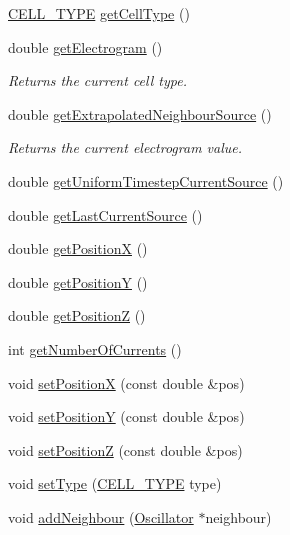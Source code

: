 \begin{DoxyCompactItemize}
\item 
\hyperlink{heart_defines_8h_a2f059cd81f362503874790462d535f5b}{C\+E\+L\+L\+\_\+\+T\+Y\+P\+E} \hyperlink{class_oscillator_aa0ae5ca40fa136d70b145d490646b8aa}{get\+Cell\+Type} ()
\item 
double \hyperlink{class_oscillator_a2eb50a29aeac6a63b4b8212d1b4cc097}{get\+Electrogram} ()
\begin{DoxyCompactList}\small\item\em Returns the current cell type. \end{DoxyCompactList}\item 
double \hyperlink{class_oscillator_a5051ab41b5036cb775faaa5f97e2c182}{get\+Extrapolated\+Neighbour\+Source} ()
\begin{DoxyCompactList}\small\item\em Returns the current electrogram value. \end{DoxyCompactList}\item 
double \hyperlink{class_oscillator_a38ec1c04097cceea46f4712fca7169e2}{get\+Uniform\+Timestep\+Current\+Source} ()
\item 
double \hyperlink{class_oscillator_ae0af6d579f485bc7ffbff790c145b388}{get\+Last\+Current\+Source} ()
\item 
double \hyperlink{class_oscillator_ad2be11901d2b0055a48890643db3350d}{get\+Position\+X} ()
\item 
double \hyperlink{class_oscillator_aaa999e4824d4e4007c0541ae78f60e6c}{get\+Position\+Y} ()
\item 
double \hyperlink{class_oscillator_a6f21f66ca4ca7a163d6b3d84eda3b8db}{get\+Position\+Z} ()
\item 
int \hyperlink{class_oscillator_a115350abaf2f6ddbf9c06027b8faa1e6}{get\+Number\+Of\+Currents} ()
\item 
void \hyperlink{class_oscillator_a672b578b643936b3b0b42371b6d339d9}{set\+Position\+X} (const double \&pos)
\item 
void \hyperlink{class_oscillator_aecfc7c140beecd6a82ab6d414892632d}{set\+Position\+Y} (const double \&pos)
\item 
void \hyperlink{class_oscillator_a597c5025182c90571804c6dc81f33e70}{set\+Position\+Z} (const double \&pos)
\item 
void \hyperlink{class_oscillator_acdee83b452a76ee20b48248cd4ba45cc}{set\+Type} (\hyperlink{heart_defines_8h_a2f059cd81f362503874790462d535f5b}{C\+E\+L\+L\+\_\+\+T\+Y\+P\+E} type)
\item 
void \hyperlink{class_oscillator_af5cd9a1f69c6e31748d54128a68628f8}{add\+Neighbour} (\hyperlink{class_oscillator}{Oscillator} $\ast$neighbour)

\end{DoxyCompactItemize}
